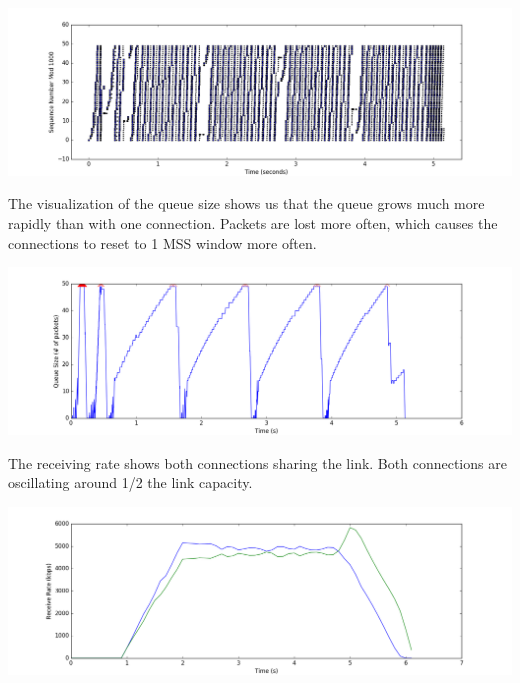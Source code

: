 \documentclass[11pt]{article}
\begin{document}
\vspace{5mm}

\includegraphics[width=17cm]{charts/two/sequence2.png}

\vspace{5mm}

The visualization of the queue size shows us that the queue grows much more rapidly than with one connection. Packets are lost more often, which causes the connections to reset to 1 MSS window more often.

\vspace{5mm}

\includegraphics[width=17cm]{charts/two/queueSize.png}

\vspace{5mm}

The receiving rate shows both connections sharing the link. Both connections are oscillating around 1/2 the link capacity.

\vspace{5mm}

\includegraphics[width=17cm]{charts/two/rateTime.png}

\vspace{5mm}
\end{document}

